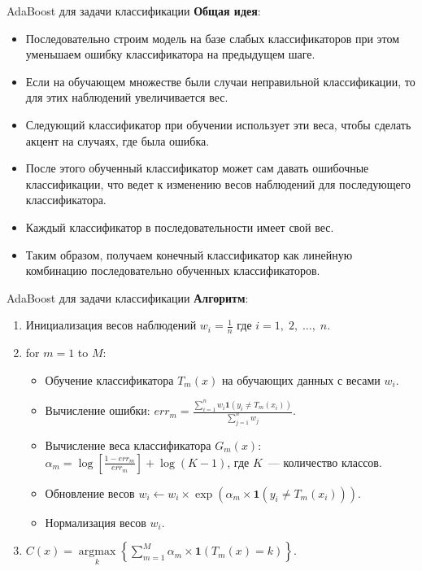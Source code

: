 \documentclass[notheorems, handout]{beamer}
\begin{document}
\begin{frame}{AdaBoost для задачи классификации}
	\textbf{Общая идея}:
	\begin{itemize}
		\item Последовательно строим модель на базе слабых классификаторов при этом уменьшаем ошибку классификатора на предыдущем шаге.
		\item Если на обучающем множестве были случаи неправильной классификации, то для этих наблюдений увеличивается вес.
		\item Следующий классификатор при обучении использует эти веса, чтобы сделать акцент на случаях, где была ошибка.
		\item После этого обученный классификатор может сам давать ошибочные классификации, что ведет к изменению весов наблюдений для последующего классификатора.
		\item Каждый классификатор в последовательности имеет свой вес.
		\item Таким образом, получаем конечный классификатор как линейную комбинацию последовательно обученных классификаторов.
	\end{itemize} 
\end{frame}

\begin{frame}{AdaBoost для задачи классификации}
	\textbf{Алгоритм}:
	\begin{enumerate}
		\item Инициализация весов наблюдений $w_{i} = \frac{1}{n}$
	где $i = 1,\; 2,\; \dots,\; n$.
		\item for $m = 1$ to $M$:
			\begin{itemize}
				\item Обучение классификатора $T_{m}(x)$ на обучающих данных с весами $w_{i}$.
				\item Вычисление ошибки: $err_{m} = \frac{\sum_{i = 1}^{n}w_{i} \mathbf{1}\left(y_{i} \neq T_{m}(x_{i})\right)}{\sum_{j = 1}^{n}w_{j}}$.
				\item Вычисление веса классификатора $G_{m}(x)$: $\alpha_{m} = \log \left[\frac{1 - err_{m}}{err_{m}} \right] + \log(K - 1)$, где $K$~--- количество классов.
				\item Обновление весов $w_{i} \gets w_{i} \times \exp(\alpha_{m} 	\times \mathbf{1}(y_{i} \neq T_{m}(x_{i})))$.
				\item Нормализация весов $w_{i}$.
			\end{itemize}
		\item $C(x) = \underset{k}{\operatorname{argmax}}\left\{\displaystyle\sum_{m = 1}^{M}\alpha_{m} \times \mathbf{1}(T_{m}(x) = k)\right\}$.
	\end{enumerate}
\end{frame}
\end{document}
